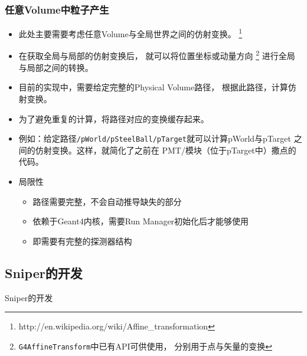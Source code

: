 \begin{frame}
    \frametitle{任意Volume中粒子产生}
    \begin{itemize}
        \item 此处主要需要考虑任意Volume与全局世界之间的仿射变换。
                \footnote{http://en.wikipedia.org/wiki/Affine\_transformation}
        \item 在获取全局与局部的仿射变换后，
              就可以将位置坐标或动量方向
              \footnote{{\tt G4AffineTransform}中已有API可供使用，
                        分别用于点与矢量的变换}
              进行全局与局部之间的转换。
        \item 目前的实现中，需要给定完整的Physical Volume路径，
              根据此路径，计算仿射变换。
        \item 为了避免重复的计算，将路径对应的变换缓存起来。
        \item 例如：给定路径{\tt /pWorld/pSteelBall/pTarget}就可以计算pWorld与pTarget
              之间的仿射变换。这样，就简化了之前在
              PMT/模块（位于pTarget中）撒点的代码。
        \item 局限性
            \begin{itemize}
                \item 路径需要完整，不会自动推导缺失的部分
                \item 依赖于Geant4内核，需要Run Manager初始化后才能够使用
                \item 即需要有完整的探测器结构
            \end{itemize}
    \end{itemize}
\end{frame}

\subsection{Sniper的开发}

\begin{frame}
    \begin{center}
        \Large Sniper的开发
    \end{center}
\end{frame}

